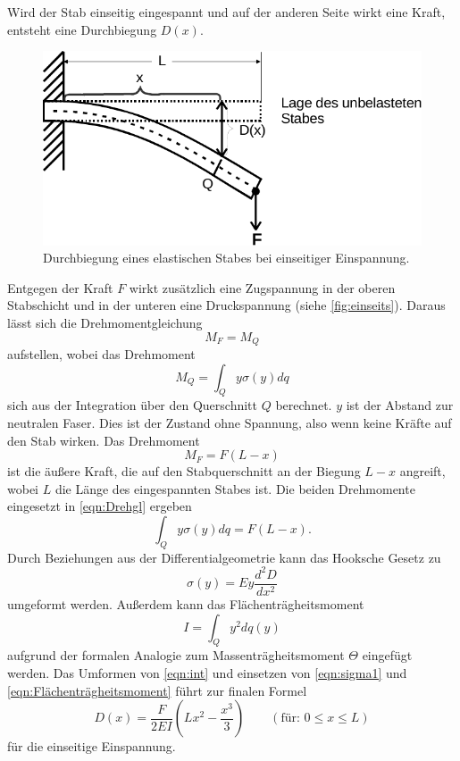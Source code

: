 Wird der Stab einseitig eingespannt und auf der anderen Seite wirkt eine Kraft, entsteht eine Durchbiegung $D(x)$.
\begin{figure}
  \centering
  \includegraphics{content/einseitig.pdf}
  \caption{Durchbiegung eines elastischen Stabes bei einseitiger Einspannung. \cite[107]{V103}}
  \label{fig:einseits}
\end{figure}
Entgegen der Kraft $F$ wirkt zusätzlich eine Zugspannung in der oberen Stabschicht und in der unteren eine Druckspannung (siehe \autoref{fig:einseits}). 
Daraus lässt sich die Drehmomentgleichung 
\begin{equation}
    M_F = M_Q
\label{eqn:Drehgl}
\end{equation}
aufstellen, wobei das Drehmoment 
\begin{equation}
    M_Q = \int_Q y \sigma(y) dq
    \label{eqn:M_Q}
\end{equation}
sich aus der Integration über den Querschnitt $Q$ berechnet.
$y$ ist der Abstand zur neutralen Faser. Dies ist der Zustand ohne Spannung, also wenn keine Kräfte auf den Stab wirken.
Das Drehmoment
\begin{equation}
    M_F = F(L-x)
    \label{eqn:M_F}
\end{equation}
ist die äußere Kraft, die auf den Stabquerschnitt an der Biegung $L-x$ angreift, 
wobei $L$ die Länge des eingespannten Stabes ist.
Die beiden Drehmomente eingesetzt in \autoref{eqn:Drehgl} ergeben
\begin{equation}
  \int_Q y \sigma(y) dq = F(L-x).\label{eqn:int}
\end{equation}
Durch Beziehungen aus der Differentialgeometrie kann das Hooksche Gesetz zu
\begin{equation}
   \sigma(y) = E y \frac{d^2D}{dx^2}\label{eqn:sigma1}
\end{equation}
umgeformt werden.
Außerdem kann das Flächenträgheitsmoment 
\begin{equation}
   I = \int_Q y^2dq(y)
   \label{eqn:Flächenträgheitsmoment}
\end{equation}
aufgrund der formalen Analogie zum Massenträgheitsmoment $\Theta$ eingefügt werden. \cite[109]{V103}
Das Umformen von \autoref{eqn:int} und einsetzen von \autoref{eqn:sigma1} und \autoref{eqn:Flächenträgheitsmoment} führt zur finalen Formel 
\begin{equation}
  D(x) = \frac{F}{2 E I}(Lx^2 - \frac{x^3}{3}) \qquad (\text{für: } 0 \leq x \leq L)
  \label{eqn:Biegung}
\end{equation}
für die einseitige Einspannung.

